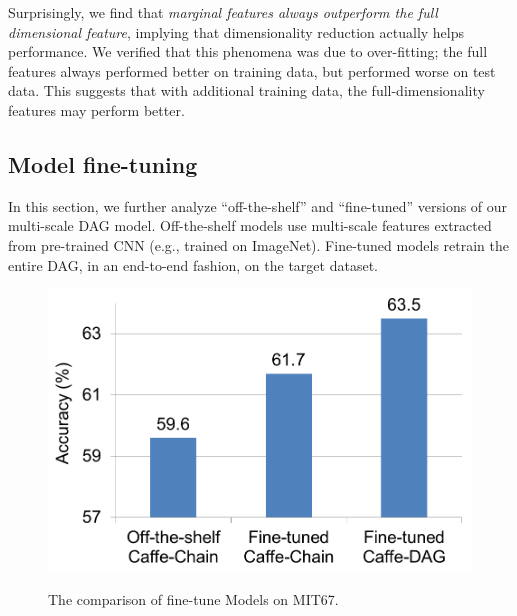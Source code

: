 \documentclass[10pt,twocolumn,letterpaper]{article}
\begin{document}
Surprisingly, we find that {\em marginal features always outperform the full dimensional feature}, implying that dimensionality reduction actually helps performance. We verified that this phenomena was due to over-fitting; the full features always performed better on training data, but performed worse on test data. This suggests that with additional training data, the full-dimensionality features may perform better.

\subsection{Model fine-tuning}

In this section, we further analyze ``off-the-shelf'' and ``fine-tuned'' versions of our multi-scale DAG model. Off-the-shelf models use multi-scale features extracted from pre-trained CNN (e.g., trained on ImageNet). Fine-tuned models retrain the entire DAG, in an end-to-end fashion, on the target dataset.

\begin{figure}[htbp]
\centering
	{\includegraphics[width=.75\columnwidth]{fig/ft_model.png}}

\caption{The comparison of fine-tune Models on MIT67.}
\label{fig:ft_model}
\end{figure}
\end{document}
